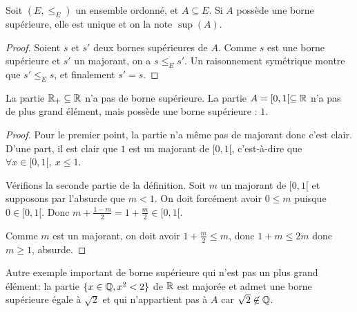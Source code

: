 \begin{proposition}
Soit $(E,\leq_E)$ un ensemble ordonné, et $A\subseteq E$. Si $A$ possède une borne supérieure, elle est unique et on la note $\sup(A)$.
\end{proposition}
\begin{proof}
Soient $s$ et $s'$ deux bornes supérieures de $A$. Comme $s$ est une borne supérieure et $s'$ un majorant, on a $s\leq_E s'$. Un raisonnement symétrique montre que  $s'\leq_E s$, et finalement $s'=s$.
\end{proof}

\begin{exemple}
La partie $\mathbb{R}_+ \subseteq \mathbb{R}$ n'a pas de borne supérieure. 
La partie $A=[0,1[ \subseteq \mathbb{R}$ n'a pas de plus grand élément, mais possède une borne supérieure : $1$.
\end{exemple}
\begin{proof} Pour le premier point, la partie n'a même pas de majorant donc c'est clair. 
D'une part, il est clair que $1$ est un majorant de $[0,1[$, c'est-à-dire que $\forall x\in [0,1[, \: x\leq 1$.

Vérifions la seconde partie de la définition.  Soit $m$ un majorant de $[0,1[$ et supposons par l'absurde que $m < 1$. On doit forcément avoir $0\leq m$ puisque $0\in [0,1[$. Donc $m+\frac{1-m}{2}=1+\frac{m}{2} \in [0,1[$.
\begin{center}
\end{center}

 Comme $m$ est un majorant, on doit avoir $1+\frac{m}{2}\leq m$, donc $1+m\leq 2m$ donc $m\geq 1$, absurde.
\end{proof}

Autre exemple important de borne supérieure qui n'est pas un plus grand élément: la partie $\{x\in \mathbb{Q}, x^2<2\}$ de $\mathbb{R}$ est majorée et admet une borne supérieure égale à $\sqrt 2$ et qui n'appartient pas à $A$ car $\sqrt2\not\in \mathbb{Q}$. 

